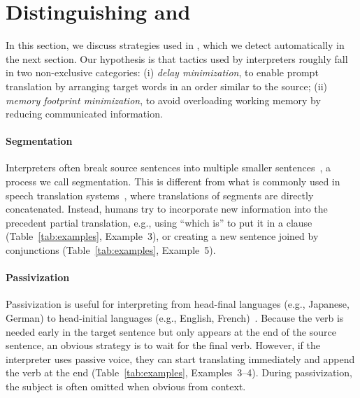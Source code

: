 
\section{Distinguishing \trans{} and \inter{}}
\label{sec:distinguish}

In this section, we discuss strategies used in \inter{}, which we
detect automatically in the next section.  Our hypothesis is that
tactics used by interpreters roughly fall in two non-exclusive
categories: (i) \emph{delay minimization}, to enable prompt
translation by arranging target words in an order similar to the
source; (ii) \emph{memory footprint minimization}, to avoid
overloading working memory by reducing communicated information.








\paragraph{Segmentation}

Interpreters often break source sentences into multiple smaller
sentences~\cite{erik11theory,shimizu13iwslt}, a process we call segmentation.
This is different from what is commonly used in speech translation
systems~\cite{fujita13timing,oda14segmentation}, where translations of segments
are directly concatenated.  Instead, humans try to incorporate new information
into the precedent partial translation, e.g., using ``which is'' to put it in a
clause (Table~\ref{tab:examples}, Example~3), or creating a new sentence joined
by conjunctions (Table~\ref{tab:examples}, Example~5).

\paragraph{Passivization}

Passivization is useful for interpreting from head-final
languages (e.g., Japanese, German) to head-initial languages (e.g., English,
French)~\cite{he15rewrite}.  Because the verb is needed early in the target sentence but only
appears at the end of the source sentence, an obvious strategy is to wait for the final
verb.  However, if the interpreter uses passive voice, they can start translating
immediately and append the verb at the end (Table~\ref{tab:examples},
Examples~3--4).  During passivization, the subject is often omitted when obvious
from context.


















